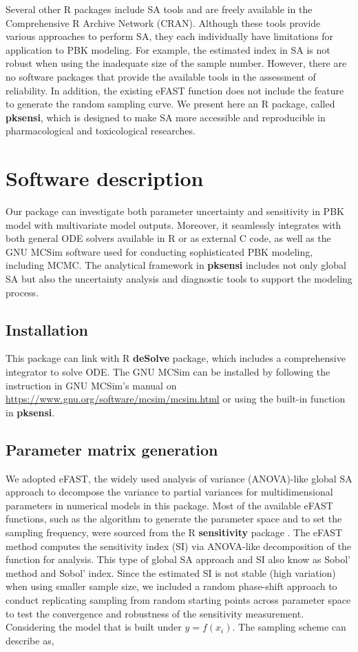 \documentclass[preprint,12pt, a4paper]{elsarticle}
\begin{document}
Several other R packages include SA tools and are freely available in the Comprehensive R Archive Network (CRAN). Although these tools provide various approaches to perform SA, they each individually have limitations for application to PBK modeling. For example, the estimated index in SA is not robust when using the inadequate size of the sample number. However, there are no software packages that provide the available tools in the assessment of reliability. In addition, the existing eFAST function does not include the feature to generate the random sampling curve. We present here an R package, called \textbf{pksensi}, which is designed to make SA more accessible and reproducible in pharmacological and toxicological researches. 


\section{Software description}

Our package can investigate both parameter uncertainty and sensitivity in PBK model with multivariate model outputs. Moreover, it seamlessly integrates with both general ODE solvers available in R or as external C code, as well as the GNU MCSim software used for conducting sophisticated PBK modeling, including MCMC. The analytical framework in \textbf{pksensi} includes not only global SA but also the uncertainty analysis and diagnostic tools to support the modeling process.


\subsection{Installation}

This package can link with R \textbf{deSolve} package, which includes a comprehensive integrator to solve ODE. The GNU MCSim can be installed by following the instruction in GNU MCSim's manual on \url{https://www.gnu.org/software/mcsim/mcsim.html} or using the built-in function in \textbf{pksensi}.

\subsection{Parameter matrix generation}

We adopted eFAST, the widely used analysis of variance (ANOVA)-like global SA approach to decompose the variance to partial variances for multidimensional parameters in numerical models in this package. Most of the available eFAST functions, such as the algorithm to generate the parameter space and to set the sampling frequency, were sourced from the R \textbf{sensitivity} package \cite{R-sensitivity}. The eFAST method computes the sensitivity index (SI) via ANOVA-like decomposition of the function for analysis. This type of global SA approach and SI also know as Sobol' method and Sobol' index. Since the estimated SI is not stable (high variation) when using smaller sample size, we included a random phase-shift approach to conduct replicating sampling from random starting points across parameter space to test the convergence and robustness of the sensitivity measurement. Considering the model that is built under \(y=f(x_{i})\). The sampling scheme can describe as,
\end{document}
